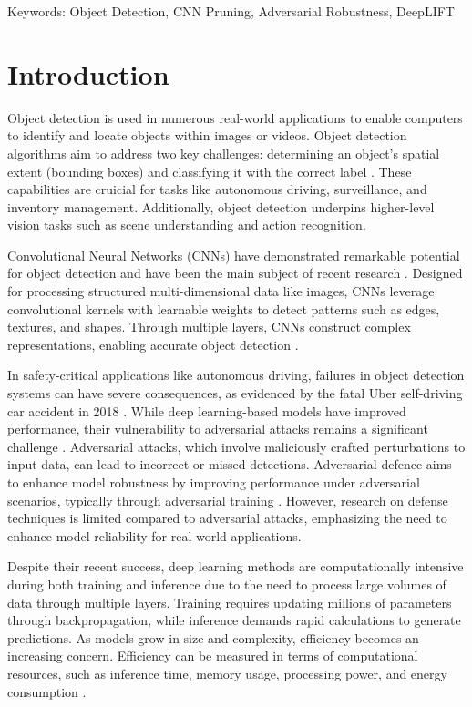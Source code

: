 \documentclass[10pt]{cai}
\begin{document}
\begin{keywords}{Keywords:}
Object Detection, CNN Pruning, Adversarial Robustness, DeepLIFT
\end{keywords}
\copyrightnotice


\section{Introduction}
Object detection is used in numerous real-world applications to enable computers to identify and locate objects within images or videos. Object detection algorithms aim to address two key challenges: determining an object's spatial extent (bounding boxes) and classifying it with the correct label \cite{zhao2019objectdetectiondeeplearning}. These capabilities are cruicial for tasks like autonomous driving, surveillance, and inventory management. Additionally, object detection underpins higher-level vision tasks such as scene understanding and action recognition.

Convolutional Neural Networks (CNNs) have demonstrated remarkable potential for object detection and have been the main subject of recent research \cite{zou2023object}. Designed for processing structured multi-dimensional data like images, CNNs leverage convolutional kernels with learnable weights to detect patterns such as edges, textures, and shapes. Through multiple layers, CNNs construct complex representations, enabling accurate object detection \cite{electronics10202470}.

In safety-critical applications like autonomous driving, failures in object detection systems can have severe consequences, as evidenced by the fatal Uber self-driving car accident in 2018 \cite{Kohli_2019}. While deep learning-based models have improved performance, their vulnerability to adversarial attacks remains a significant challenge \cite{zhang2019adversarially}. Adversarial attacks, which involve maliciously crafted perturbations to input data, can lead to incorrect or missed detections. Adversarial defence aims to enhance model robustness by improving performance under adversarial scenarios, typically through adversarial training \cite{costa2023deep}. 
However, research on defense techniques is limited compared to adversarial attacks, emphasizing the need to enhance model reliability for real-world applications.

Despite their recent success, deep learning methods are computationally intensive during both training and inference due to the need to process large volumes of data through multiple layers. Training requires updating millions of parameters through backpropagation, while inference demands rapid calculations to generate predictions. As models grow in size and complexity, efficiency becomes an increasing concern. Efficiency can be measured in terms of computational resources, such as inference time, memory usage, processing power, and energy consumption \cite{electronics11060945}. 
\end{document}
